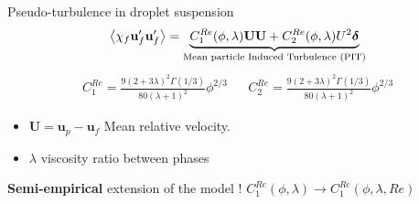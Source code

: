 \documentclass{sintefbeamer}
\begin{document}
\begin{frame}
  {
  Pseudo-turbulence in droplet suspension
  }
  \small
  \begin{equation*}
    \left<\chi_f  \textbf{u}_f' \textbf{u}_f'\right>
    =
    \underbrace{
      C^{Re}_1(\phi,\lambda)\textbf{UU}
    + C^{Re}_2(\phi,\lambda)U^2 \bm\delta}_\text{Mean particle Induced Turbulence (PIT)}
  \end{equation*}
  \begin{align*}
    C^{Re}_{1} = \frac{9(2+3\lambda)^2 \Gamma(1/3)}{80 (\lambda +1)^2}\phi^{2/3} 
    &&
    C^{Re}_2 = \frac{9(2+3\lambda)^2 \Gamma(1/3)}{80 (\lambda +1)^2}\phi^{2/3} 
  \end{align*}
  \begin{itemize}
    \item $\textbf{U} = \textbf{u}_p - \textbf{u}_f$ Mean relative velocity. 
    \item $\lambda$ viscosity ratio between phases
  \end{itemize}
\vfill
\textbf{Semi-empirical} extension of the model !
$C^{Re}_1(\phi, \lambda ) \to C^{Re}_1(\phi, \lambda ,Re) $ 

\end{frame}
\end{document}
